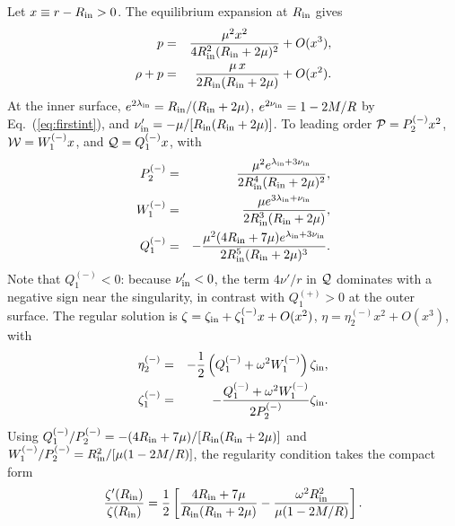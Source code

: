 \documentclass[%
 reprint,
 amsmath,amssymb,
 aps,prd,
 superscriptaddress,
]{revtex4-2}
\begin{document}
Let $x\equiv r-R_{\rm in}>0$. The equilibrium expansion at $R_{\rm in}$ gives
\begin{eqnarray}
    p &=& \frac{\mu^2x^2}{4R_{\rm in}^2(R_{\rm in}+2\mu)^2}+O(x^3),\nonumber\\
    \rho+p &=& \frac{\mu\,x}{2R_{\rm in}(R_{\rm in}+2\mu)}+O(x^2).
    \label{eq:pinner}
\end{eqnarray}
At the inner surface, $e^{2\lambda_{\rm in}} = R_{\rm in}/(R_{\rm in}+2\mu)$, $e^{2\nu_{\rm in}} = 1-2M/R$ by Eq.~(\ref{eq:firstint}), and $\nu'_{\rm in} = -\mu/[R_{\rm in}(R_{\rm in}+2\mu)]$. To leading order ${\cal P} = P_2^{(-)}x^2$, ${\cal W} = W_1^{(-)}x$, and ${\cal Q} = Q_1^{(-)}x$, with
\begin{eqnarray}
    P_2^{(-)} &=& \frac{\mu^2 e^{\lambda_{\rm in}+3\nu_{\rm in}}}{2R_{\rm in}^4(R_{\rm in}+2\mu)^2},\nonumber\\
    W_1^{(-)} &=& \frac{\mu e^{3\lambda_{\rm in}+\nu_{\rm in}}}{2R_{\rm in}^3(R_{\rm in}+2\mu)},\nonumber\\
    Q_1^{(-)} &=& -\frac{\mu^2(4R_{\rm in}+7\mu)e^{\lambda_{\rm in}+3\nu_{\rm in}}}{2R_{\rm in}^5(R_{\rm in}+2\mu)^3}.
    \label{eq:Q1inner}
\end{eqnarray}
Note that $Q_1^{(-)}<0$: because $\nu'_{\rm in}<0$, the term $4\nu'/r$ in ${\cal Q}$ dominates with a negative sign near the singularity, in contrast with $Q_1^{(+)}>0$ at the outer surface. The regular solution is $\zeta = \zeta_{\rm in}+\zeta_1^{(-)}x+O(x^2)$, $\eta = \eta_2^{(-)}x^2+O(x^3)$, with
\begin{eqnarray}
    \eta_2^{(-)} &=& -\frac{1}{2}\left(Q_1^{(-)}+\omega^2W_1^{(-)}\right)\zeta_{\rm in} ,\nonumber\\
    \zeta_1^{(-)} &=& -\frac{Q_1^{(-)}+\omega^2W_1^{(-)}}{2P_2^{(-)}}\zeta_{\rm in} .
    \label{eq:zeta1inner}
\end{eqnarray}
Using $Q_1^{(-)}/P_2^{(-)} = -(4R_{\rm in}+7\mu)/[R_{\rm in}(R_{\rm in}+2\mu)]$ and $W_1^{(-)}/P_2^{(-)} = R_{\rm in}^2/[\mu(1-2M/R)]$, the regularity condition takes the compact form
\begin{equation}
    \frac{\zeta'(R_{\rm in})}{\zeta(R_{\rm in})} = \frac{1}{2}\left[\frac{4R_{\rm in}+7\mu}{R_{\rm in}(R_{\rm in}+2\mu)}-\frac{\omega^2R_{\rm in}^2}{\mu(1-2M/R)}\right].
    \label{eq:inner_regular}
\end{equation}
\end{document}
